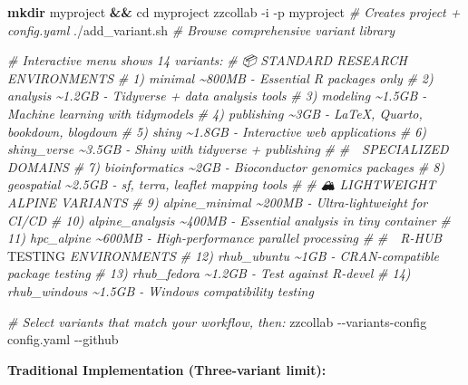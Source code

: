 \documentclass[
]{article}
\newenvironment{Shaded}{\begin{snugshade}}{\end{snugshade}}
\newcommand{\AlertTok}[1]{\textcolor[rgb]{0.94,0.16,0.16}{#1}}
\newcommand{\AttributeTok}[1]{\textcolor[rgb]{0.13,0.29,0.53}{#1}}
\newcommand{\BuiltInTok}[1]{#1}
\newcommand{\CommentTok}[1]{\textcolor[rgb]{0.56,0.35,0.01}{\textit{#1}}}
\newcommand{\ExtensionTok}[1]{#1}
\newcommand{\FunctionTok}[1]{\textcolor[rgb]{0.13,0.29,0.53}{\textbf{#1}}}
\newcommand{\KeywordTok}[1]{\textcolor[rgb]{0.13,0.29,0.53}{\textbf{#1}}}
\newcommand{\NormalTok}[1]{#1}
\begin{document}
\begin{Shaded}
\begin{Highlighting}[]
\FunctionTok{mkdir}\NormalTok{ myproject }\KeywordTok{\&\&} \BuiltInTok{cd}\NormalTok{ myproject}
\ExtensionTok{zzcollab} \AttributeTok{{-}i} \AttributeTok{{-}p}\NormalTok{ myproject             }\CommentTok{\# Creates project + config.yaml}
\ExtensionTok{./add\_variant.sh}                     \CommentTok{\# Browse comprehensive variant library}

\CommentTok{\# Interactive menu shows 14 variants:}
\CommentTok{\# 📦 STANDARD RESEARCH ENVIRONMENTS}
\CommentTok{\#  1) minimal          \textasciitilde{}800MB  {-} Essential R packages only}
\CommentTok{\#  2) analysis         \textasciitilde{}1.2GB  {-} Tidyverse + data analysis tools  }
\CommentTok{\#  3) modeling         \textasciitilde{}1.5GB  {-} Machine learning with tidymodels}
\CommentTok{\#  4) publishing       \textasciitilde{}3GB    {-} LaTeX, Quarto, bookdown, blogdown}
\CommentTok{\#  5) shiny            \textasciitilde{}1.8GB  {-} Interactive web applications}
\CommentTok{\#  6) shiny\_verse      \textasciitilde{}3.5GB  {-} Shiny with tidyverse + publishing}
\CommentTok{\#}
\CommentTok{\# 🔬 SPECIALIZED DOMAINS}
\CommentTok{\#  7) bioinformatics   \textasciitilde{}2GB    {-} Bioconductor genomics packages}
\CommentTok{\#  8) geospatial       \textasciitilde{}2.5GB  {-} sf, terra, leaflet mapping tools}
\CommentTok{\#}
\CommentTok{\# 🏔️ LIGHTWEIGHT ALPINE VARIANTS  }
\CommentTok{\#  9) alpine\_minimal   \textasciitilde{}200MB  {-} Ultra{-}lightweight for CI/CD}
\CommentTok{\# 10) alpine\_analysis  \textasciitilde{}400MB  {-} Essential analysis in tiny container}
\CommentTok{\# 11) hpc\_alpine       \textasciitilde{}600MB  {-} High{-}performance parallel processing}
\CommentTok{\#}
\CommentTok{\# 🧪 R{-}HUB }\AlertTok{TESTING}\CommentTok{ ENVIRONMENTS}
\CommentTok{\# 12) rhub\_ubuntu      \textasciitilde{}1GB    {-} CRAN{-}compatible package testing}
\CommentTok{\# 13) rhub\_fedora      \textasciitilde{}1.2GB  {-} Test against R{-}devel}
\CommentTok{\# 14) rhub\_windows     \textasciitilde{}1.5GB  {-} Windows compatibility testing}

\CommentTok{\# Select variants that match your workflow, then:}
\ExtensionTok{zzcollab} \AttributeTok{{-}{-}variants{-}config}\NormalTok{ config.yaml }\AttributeTok{{-}{-}github}
\end{Highlighting}
\end{Shaded}

\textbf{Traditional Implementation (Three-variant limit):}
\end{document}
